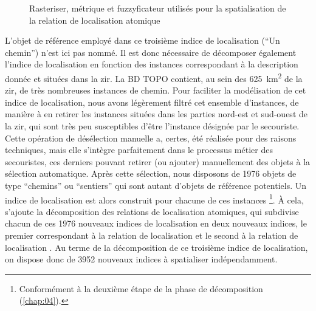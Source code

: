 \begin{figure}
  \centering
  
  \caption{Rasteriser, métrique et fuzzyficateur utilisés pour la
    spatialisation de la relation de localisation atomique
    \protect{}}
  \label{fig:ex_parties_statialisation_Proximal}
\end{figure}

L'objet de référence employé dans ce troisième indice de localisation
(\enquote{Un chemin}) n'est ici pas nommé. Il est donc nécessaire de
décomposer également l'indice de localisation en fonction des
instances correspondant à la description donnée et situées dans la
\ac{zir}. La BD TOPO contient, au sein des
\SI{625}{\kilo\meter\squared} de la \ac{zir}, de très nombreuses
instances de chemin. Pour faciliter la modélisation de cet indice de
localisation, nous avons légèrement filtré cet ensemble d'instances,
de manière à en retirer les instances situées dans les parties
nord-est et sud-ouest de la \ac{zir}, qui sont très peu susceptibles
d'être l'instance désignée par le secouriste. Cette opération de
désélection manuelle a, certes, été réalisée pour des raisons
techniques, mais elle s'intègre parfaitement dans le processus métier
des secouristes, ces derniers pouvant retirer (ou ajouter)
manuellement des objets à la sélection automatique. Après cette
sélection, nous disposons de \num{1976} objets de type
\enquote{chemins} ou \enquote{sentiers} qui sont autant d'objets de
référence potentiels. Un indice de localisation est alors construit
pour chacune de ces instances \footnote{Conformément à la deuxième
  étape de la phase de décomposition (\autoref{chap:04}).}. À cela,
s'ajoute la décomposition des relations de localisation atomiques, qui
subdivise chacun de ces \num{1976} nouveaux indices de localisation en
deux nouveaux indices, le premier correspondant à la relation de
localisation  et le second à la relation de
localisation . Au terme de la décomposition de ce
troisième indice de localisation, on dispose donc de \num{3952}
nouveaux indices à spatialiser indépendamment.


